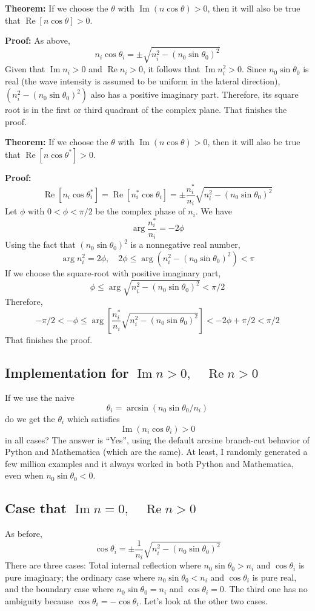 \documentclass[12pt]{article}
\renewcommand{\(}{\left(}
\renewcommand{\)}{\right)}
\renewcommand{\Im}{\operatorname{Im}}
\renewcommand{\Re}{\operatorname{Re}}
\begin{document}
{\bf Theorem:} If we choose the $\theta$ with $\Im(n \cos \theta)>0$, then it will also be true that $\Re[n \cos\theta] > 0$.

{\bf Proof:} As above,
$$n_i \cos \theta_i = \pm \sqrt{n_i^2 - (n_0 \sin \theta_0)^2}$$
Given that $\Im n_i>0$ and $\Re n_i > 0$, it follows that $\Im n_i^2 >0$. Since $n_0 \sin \theta_0$ is real (the wave intensity is assumed to be uniform in the lateral direction), $(n_i^2 - (n_0 \sin \theta_0)^2)$ also has a positive imaginary part. Therefore, its square root is in the first or third quadrant of the complex plane. That finishes the proof.

{\bf Theorem:} If we choose the $\theta$ with $\Im(n \cos \theta)>0$, then it will also be true that $\Re[n \cos\theta^*] > 0$.

{\bf Proof:}
$$\Re[n_i \cos \theta_i^*] = \Re[n_i^* \cos \theta_i ] = \pm \frac{n_i^*}{n_i}\sqrt{n_i^2 - (n_0 \sin \theta_0)^2}$$
Let $\phi$ with $0<\phi<\pi/2$ be the complex phase of $n_i$. We have
$$\arg \frac{n_i^*}{n_i} = -2\phi$$
Using the fact that $(n_0 \sin \theta_0)^2$ is a nonnegative real number,
$$\arg n_i^2 = 2\phi, \quad 2\phi \leq \arg (n_i^2 - (n_0 \sin \theta_0)^2) < \pi$$
If we choose the square-root with positive imaginary part,
$$\phi \leq \arg \sqrt{n_i^2 - (n_0 \sin \theta_0)^2} < \pi/2$$
Therefore,
$$-\pi/2 < -\phi \leq \arg \left[ \frac{n_i^*}{n_i} \sqrt{n_i^2 - (n_0 \sin \theta_0)^2}\right] < -2\phi+\pi/2 < \pi/2$$
That finishes the proof.

\subsection{Implementation for $\Im n>0, \quad \Re n >0$}
If we use the naive
$$\theta_i = \arcsin(n_0 \sin \theta_0 / n_i)$$
do we get the $\theta_i$ which satisfies
$$\Im(n_i \cos \theta_i)>0$$
in all cases? The answer is ``Yes'', using the default arcsine branch-cut behavior of Python and Mathematica (which are the same). At least, I randomly generated a few million examples and it always worked in both Python and Mathematica, even when $n_0\sin\theta_0<0$.

\subsection{Case that $\Im n=0, \quad \Re n > 0$}
As before,
$$\cos \theta_i = \pm \frac{1}{n_i} \sqrt{n_i^2 - (n_0 \sin \theta_0)^2}$$
There are three cases: Total internal reflection where $n_0\sin\theta_0>n_i$ and $\cos \theta_i$ is pure imaginary; the ordinary case where $n_0 \sin \theta_0 < n_i$ and $\cos \theta_i$ is pure real, and the boundary case where $n_0 \sin \theta_0 = n_i$ and $\cos \theta_i = 0$. The third one has no ambiguity because $\cos \theta_i = -\cos \theta_i$. Let's look at the other two cases.
\end{document}
